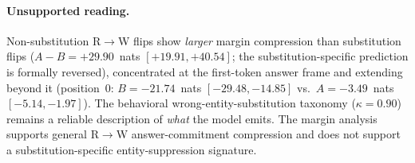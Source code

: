 \documentclass{article}
\begin{document}
\paragraph{Unsupported reading.}
Non-substitution R$\to$W flips show \emph{larger} margin compression than substitution flips ($A - B = +29.90$~nats $[+19.91, +40.54]$; the substitution-specific prediction is formally reversed), concentrated at the first-token answer frame and extending beyond it (position~0: $B = -21.74$~nats $[-29.48, -14.85]$ vs.\ $A = -3.49$~nats $[-5.14, -1.97]$).
The behavioral wrong-entity-substitution taxonomy ($\kappa = 0.90$) remains a reliable description of \emph{what} the model emits.
The margin analysis supports general R$\to$W answer-commitment compression and does not support a substitution-specific entity-suppression signature.
\FloatBarrier
\end{document}
